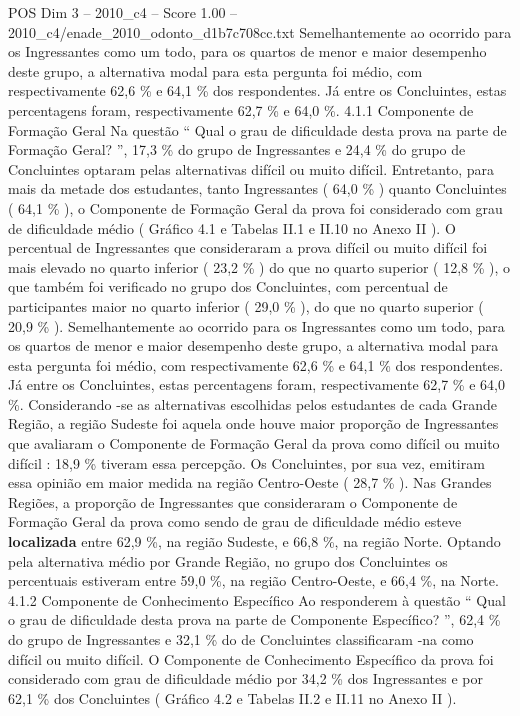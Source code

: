 \begin{textsample}{POS Dim 3 – 2010\_c4 – Score 1.00 – 2010\_c4/enade\_2010\_odonto\_d1b7c708cc.txt}
Semelhantemente ao ocorrido para os Ingressantes como um todo, para os quartos de menor e maior desempenho deste grupo, a alternativa modal para esta pergunta foi médio, com respectivamente 62,6 \% e 64,1 \% dos respondentes.
Já entre os Concluintes, estas percentagens foram, respectivamente 62,7 \% e 64,0 \%. 4.1.1 Componente de Formação Geral Na questão “ Qual o grau de dificuldade desta prova na parte de Formação Geral? ”, 17,3 \% do grupo de Ingressantes e 24,4 \% do grupo de Concluintes optaram pelas alternativas difícil ou muito difícil.
Entretanto, para mais da metade dos estudantes, tanto Ingressantes ( 64,0 \% ) quanto Concluintes ( 64,1 \% ), o Componente de Formação Geral da prova foi considerado com grau de dificuldade médio ( Gráfico 4.1 e Tabelas II.1 e II.10 no Anexo II ).
O percentual de Ingressantes que consideraram a prova difícil ou muito difícil foi mais elevado no quarto inferior ( 23,2 \% ) do que no quarto superior ( 12,8 \% ), o que também foi verificado no grupo dos Concluintes, com percentual de participantes maior no quarto inferior ( 29,0 \% ), do que no quarto superior ( 20,9 \% ).
Semelhantemente ao ocorrido para os Ingressantes como um todo, para os quartos de menor e maior desempenho deste grupo, a alternativa modal para esta pergunta foi médio, com respectivamente 62,6 \% e 64,1 \% dos respondentes.
Já entre os Concluintes, estas percentagens foram, respectivamente 62,7 \% e 64,0 \%.
Considerando -se as alternativas escolhidas pelos estudantes de cada Grande Região, a região Sudeste foi aquela onde houve maior proporção de Ingressantes que avaliaram o Componente de Formação Geral da prova como difícil ou muito difícil : 18,9 \% tiveram essa percepção.
Os Concluintes, por sua vez, emitiram essa opinião em maior medida na região Centro-Oeste ( 28,7 \% ).
Nas Grandes Regiões, a proporção de Ingressantes que consideraram o Componente de Formação Geral da prova como sendo de grau de dificuldade médio esteve \textbf{localizada} entre 62,9 \%, na região Sudeste, e 66,8 \%, na região Norte.
Optando pela alternativa médio por Grande Região, no grupo dos Concluintes os percentuais estiveram entre 59,0 \%, na região Centro-Oeste, e 66,4 \%, na Norte. 4.1.2 Componente de Conhecimento Específico Ao responderem à questão “ Qual o grau de dificuldade desta prova na parte de Componente Específico? ”, 62,4 \% do grupo de Ingressantes e 32,1 \% do de Concluintes classificaram -na como difícil ou muito difícil.
O Componente de Conhecimento Específico da prova foi considerado com grau de dificuldade médio por 34,2 \% dos Ingressantes e por 62,1 \% dos Concluintes ( Gráfico 4.2 e Tabelas II.2 e II.11 no Anexo II ).

\end{textsample}
